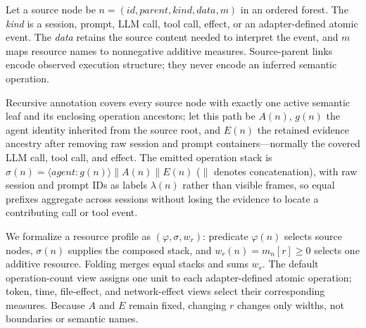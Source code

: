 \documentclass[letterpaper]{article}
\begin{document}
Let a source node be $n=(id,parent,kind,data,m)$ in an ordered forest.
The \textit{kind} is a session, prompt, LLM call, tool call, effect, or an
adapter-defined atomic event. The \textit{data} retains the source content
needed to interpret the event, and $m$ maps resource names to nonnegative
additive measures. Source-parent links encode observed execution structure;
they never encode an inferred semantic operation.

Recursive annotation covers every source node with exactly one active semantic
leaf and its enclosing operation ancestors; let this path be $A(n)$, $g(n)$ the
agent identity inherited from the source root, and $E(n)$ the retained evidence
ancestry after removing raw session and prompt containers---normally the covered
LLM call, tool call, and effect. The emitted operation stack is
$\sigma(n)=\langle\textit{agent}:g(n)\rangle\mathbin{\|}A(n)\mathbin{\|}E(n)$
($\|$ denotes concatenation), with raw session and prompt IDs as labels
$\lambda(n)$ rather than visible frames, so equal prefixes aggregate across
sessions without losing the evidence to locate a contributing call or tool event.

\label{sec:stacks}
We formalize a resource profile as $(\varphi,\sigma,w_r)$: predicate
$\varphi(n)$ selects source nodes, $\sigma(n)$ supplies the composed stack, and
$w_r(n)=m_n[r]\geq0$ selects one additive resource. Folding merges equal stacks
and sums $w_r$. The default operation-count view assigns one unit to each
adapter-defined atomic operation; token, time, file-effect, and network-effect
views select their corresponding measures. Because $A$ and $E$ remain fixed,
changing $r$ changes only widths, not boundaries or semantic names.
\end{document}

